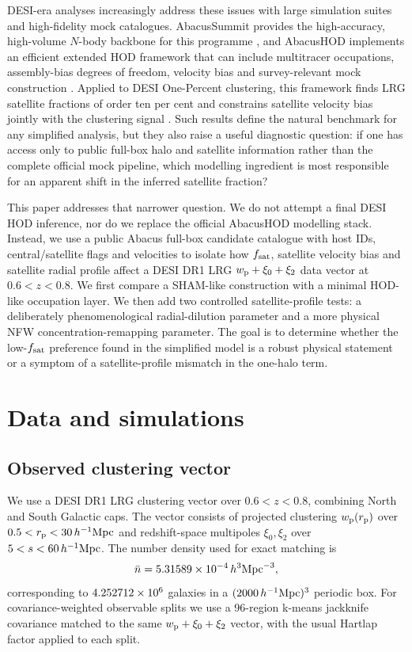 \documentclass[fleqn,usenatbib]{mnras}
\newcommand{\fsat}{f_{\rm sat}}
\newcommand{\wproj}{w_{\rm p}}
\newcommand{\xizero}{\xi_0}
\newcommand{\xitwo}{\xi_2}
\newcommand{\hmpc}{h^{-1}{\rm Mpc}}
\newcommand{\nbar}{\bar{n}}
\begin{document}
DESI-era analyses increasingly address these issues with large simulation suites and high-fidelity mock catalogues.  AbacusSummit provides the high-accuracy, high-volume $N$-body backbone for this programme \citep{Maksimova2021}, and AbacusHOD implements an efficient extended HOD framework that can include multitracer occupations, assembly-bias degrees of freedom, velocity bias and survey-relevant mock construction \citep{Yuan2022}.  Applied to DESI One-Percent clustering, this framework finds LRG satellite fractions of order ten per cent and constrains satellite velocity bias jointly with the clustering signal \citep{Yuan2024}.  Such results define the natural benchmark for any simplified analysis, but they also raise a useful diagnostic question: if one has access only to public full-box halo and satellite information rather than the complete official mock pipeline, which modelling ingredient is most responsible for an apparent shift in the inferred satellite fraction?

This paper addresses that narrower question.  We do not attempt a final DESI HOD inference, nor do we replace the official AbacusHOD modelling stack.  Instead, we use a public Abacus full-box candidate catalogue with host IDs, central/satellite flags and velocities to isolate how $\fsat$, satellite velocity bias and satellite radial profile affect a DESI DR1 LRG $\wproj+\xizero+\xitwo$ data vector at $0.6<z<0.8$.  We first compare a SHAM-like construction with a minimal HOD-like occupation layer.  We then add two controlled satellite-profile tests: a deliberately phenomenological radial-dilution parameter and a more physical NFW concentration-remapping parameter.  The goal is to determine whether the low-$\fsat$ preference found in the simplified model is a robust physical statement or a symptom of a satellite-profile mismatch in the one-halo term.

\section{Data and simulations}
\label{sec:data}

\subsection{Observed clustering vector}

We use a DESI DR1 LRG clustering vector over $0.6<z<0.8$, combining North and South Galactic caps.  The vector consists of projected clustering $\wproj(r_{\rm p})$ over $0.5<r_{\rm p}<30\,\hmpc$ and redshift-space multipoles $\xizero,\xitwo$ over $5<s<60\,\hmpc$.  The number density used for exact matching is
\begin{equation}
  \nbar = \ObservedNbar\,h^3{\rm Mpc}^{-3},
\end{equation}
corresponding to $4.252712\times10^{6}$ galaxies in a $(\BoxSize\,\hmpc)^3$ periodic box.  For covariance-weighted observable splits we use a 96-region k-means jackknife covariance matched to the same $\wproj+\xizero+\xitwo$ vector, with the usual Hartlap factor applied to each split.
\end{document}

